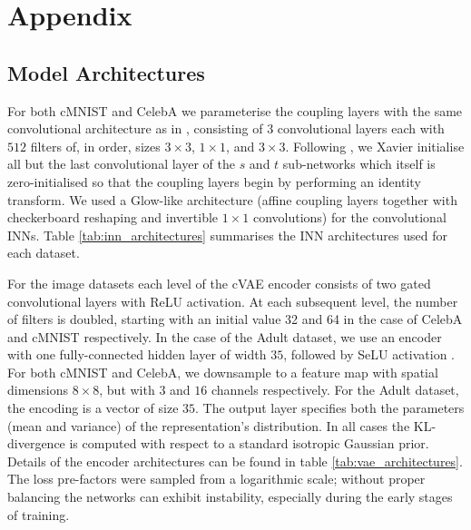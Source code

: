
\section{Appendix}\label{sec:nifr-appendix}


\subsection{Model Architectures}%
\label{sec:architectures}
\noindent For both cMNIST and CelebA we parameterise the coupling layers with the same convolutional architecture as in \citet{KinDha18}, consisting of $3$ convolutional layers each with $512$ filters of, in order, sizes $3\times3$, $1\times1$, and $3\times3$.
Following \citet{ardizzone2019guided}, we Xavier initialise all but the last convolutional layer of the $s$ and $t$ sub-networks which itself is zero-initialised so that the coupling layers begin by performing an identity transform. We used a Glow-like architecture \citep{KinDha18} (affine coupling layers together with checkerboard reshaping and invertible $1\times1$ convolutions) for the convolutional INNs. Table \ref{tab:inn_architectures} summarises the INN architectures used for each dataset.

For the image datasets each level of the cVAE encoder consists of two gated convolutional layers \citep{van2016conditional} with ReLU activation. 
At each subsequent level, the number of filters is doubled, starting with an initial value 32 and 64 in the case of CelebA and cMNIST respectively. 
In the case of the Adult dataset, we use an encoder with one fully-connected hidden layer of width $35$, followed by SeLU activation \citep{klambauer2017self}. 
For both cMNIST and CelebA, we downsample to a feature map with spatial dimensions $8\times8$, but with $3$ and $16$ channels respectively. 
For the Adult dataset, the encoding is a vector of size $35$. 
The output layer specifies both the parameters (mean and variance) of the representation's distribution. 
In all cases the KL-divergence is computed with respect to a standard isotropic Gaussian prior. 
Details of the encoder architectures can be found in table \ref{tab:vae_architectures}. The loss pre-factors were sampled from a logarithmic scale; without proper balancing the networks can exhibit instability, especially during the early stages of training.

